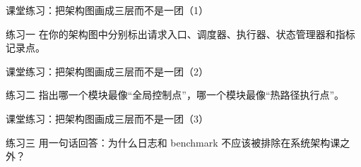 \begin{frame}{课堂练习：把架构图画成三层而不是一团（1）}
\begin{block}{练习一}
    在你的架构图中分别标出请求入口、调度器、执行器、状态管理器和指标记录点。
  \end{block}
\end{frame}

\begin{frame}{课堂练习：把架构图画成三层而不是一团（2）}
\begin{block}{练习二}
    指出哪一个模块最像“全局控制点”，哪一个模块最像“热路径执行点”。
  \end{block}
\end{frame}

\begin{frame}{课堂练习：把架构图画成三层而不是一团（3）}
\begin{block}{练习三}
    用一句话回答：为什么日志和 benchmark 不应该被排除在系统架构课之外？
  \end{block}
\end{frame}
